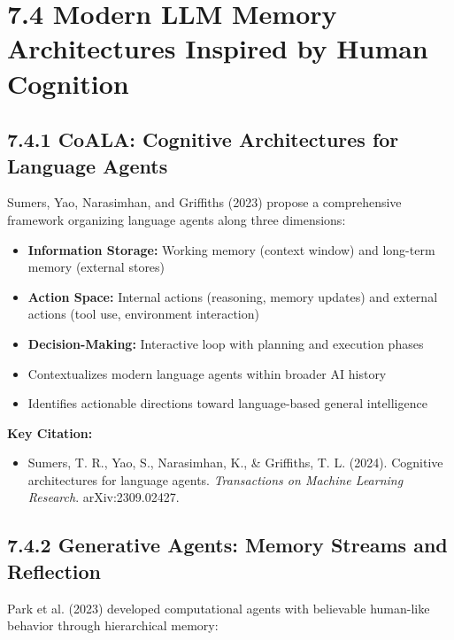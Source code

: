 \documentclass[11pt,letterpaper]{article}
\begin{document}
\section{\color{garnet}7.4 Modern LLM Memory Architectures Inspired by Human Cognition}

\subsection{7.4.1 CoALA: Cognitive Architectures for Language Agents}

Sumers, Yao, Narasimhan, and Griffiths (2023) propose a comprehensive framework organizing language agents along three dimensions:

\begin{itemize}[leftmargin=*]
    \item \textbf{Information Storage:} Working memory (context window) and long-term memory (external stores)
    \item \textbf{Action Space:} Internal actions (reasoning, memory updates) and external actions (tool use, environment interaction)
    \item \textbf{Decision-Making:} Interactive loop with planning and execution phases
    \item Contextualizes modern language agents within broader AI history
    \item Identifies actionable directions toward language-based general intelligence
\end{itemize}

\textbf{Key Citation:}
\begin{itemize}[leftmargin=*]
    \item Sumers, T. R., Yao, S., Narasimhan, K., \& Griffiths, T. L. (2024). Cognitive architectures for language agents. \textit{Transactions on Machine Learning Research}. arXiv:2309.02427.
\end{itemize}

\subsection{7.4.2 Generative Agents: Memory Streams and Reflection}

Park et al. (2023) developed computational agents with believable human-like behavior through hierarchical memory:
\end{document}

